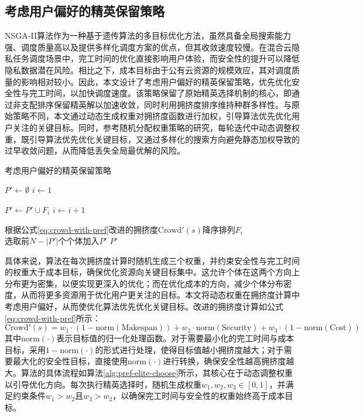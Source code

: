 \subsection{考虑用户偏好的精英保留策略}

NSGA-II算法作为一种基于遗传算法的多目标优化方法，虽然具备全局搜索能力强、调度质量高以及提供多样化调度方案的优点，但其收敛速度较慢。在混合云隐私任务调度场景中，完工时间的优化直接影响用户体验，而安全性的提升可以降低隐私数据潜在风险。相比之下，成本目标由于公有云资源的规模效应，其对调度质量的影响相对较小。因此，本文设计了考虑用户偏好的精英保留策略，优先优化安全性与完工时间，以加快调度速度。该策略保留了原始精英选择机制的核心，即通过非支配排序保留精英解以加速收敛，同时利用拥挤度排序维持种群多样性。与原始策略不同，本文通过动态生成权重对拥挤度函数进行加权，引导算法优先优化用户关注的关键目标。同时，参考随机分配权重策略的研究\cite{wangIntegratingWeightAssignment2018}，每轮迭代中动态调整权重，既引导算法优先优化关键目标，又通过多样化的搜索方向避免静态加权导致的过早收敛问题，从而降低丢失全局最优解的风险。

\begin{algorithm}[htb!]
    \SetAlgoLined
    \caption{考虑用户偏好的精英保留策略}\label{alg:pref-elite-choose}
    \(P' \gets \emptyset\) 
    \(i \gets 1\)

     {
        \(P' \gets P' \cup F_i\) 
        \(i \gets i+1\)
    }

    根据公式\eqref{eq:crowd-with-pref}改进的拥挤度\(\text{Crowd}'(s)\)降序排列\(F_i\) \\
    选取前\(N - |P'|\)个个体加入\(P'\)
    \Return \(P'\)
\end{algorithm}

具体来说，算法在每次拥挤度计算时随机生成三个权重，并约束安全性与完工时间的权重大于成本目标，确保优化资源向关键目标集中。这允许个体在这两个方向上分布更为密集，以便实现更深入的优化；而在优化成本的方向，减少个体分布密度，从而将更多资源用于优化用户更关注的目标。本文将动态权重在拥挤度计算中考虑用户偏好，从而使优化算法优先优化关键目标。改进的拥挤度计算如公式\eqref{eq:crowd-with-pref}所示：
\begin{equation}
    \text{Crowd}'(s) = w_1 \cdot (1-\text{norm}(\text{Makespan})) + w_2 \cdot \text{norm}(\text{Security}) + w_3 \cdot (1-\text{norm}(\text{Cost}))
    \label{eq:crowd-with-pref}
\end{equation}
其中\(\text{norm}(\cdot)\)表示目标值的归一化处理函数。对于需要最小化的完工时间与成本目标，采用\(1-\text{norm}(\cdot)\)的形式进行处理，使得目标值越小拥挤度越大；对于需要最大化的安全性目标，直接使用\(\text{norm}(\cdot)\)进行转换，确保安全性越高拥挤度越大。算法的具体流程如算法\ref{alg:pref-elite-choose}所示，其核心在于动态调整权重以引导优化方向。每次执行精英选择时，随机生成权重\(w_1, w_2, w_3 \in [0,1]\)，并满足约束条件\(w_1 > w_2\)且\(w_3 > w_2\)，以确保完工时间与安全性的权重始终高于成本目标。


